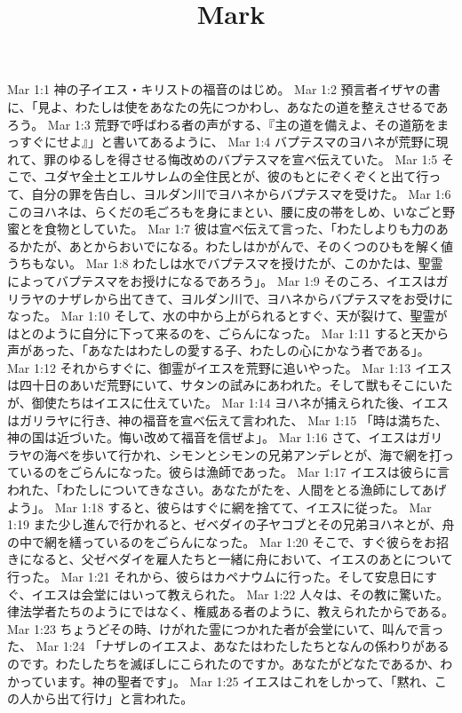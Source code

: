 

\title{Mark}

Mar 1:1  神の子イエス・キリストの福音のはじめ。
Mar 1:2  預言者イザヤの書に、「見よ、わたしは使をあなたの先につかわし、あなたの道を整えさせるであろう。
Mar 1:3  荒野で呼ばわる者の声がする、『主の道を備えよ、その道筋をまっすぐにせよ』」と書いてあるように、
Mar 1:4  バプテスマのヨハネが荒野に現れて、罪のゆるしを得させる悔改めのバプテスマを宣べ伝えていた。
Mar 1:5  そこで、ユダヤ全土とエルサレムの全住民とが、彼のもとにぞくぞくと出て行って、自分の罪を告白し、ヨルダン川でヨハネからバプテスマを受けた。
Mar 1:6  このヨハネは、らくだの毛ごろもを身にまとい、腰に皮の帯をしめ、いなごと野蜜とを食物としていた。
Mar 1:7  彼は宣べ伝えて言った、「わたしよりも力のあるかたが、あとからおいでになる。わたしはかがんで、そのくつのひもを解く値うちもない。
Mar 1:8  わたしは水でバプテスマを授けたが、このかたは、聖霊によってバプテスマをお授けになるであろう」。
Mar 1:9  そのころ、イエスはガリラヤのナザレから出てきて、ヨルダン川で、ヨハネからバプテスマをお受けになった。
Mar 1:10  そして、水の中から上がられるとすぐ、天が裂けて、聖霊がはとのように自分に下って来るのを、ごらんになった。
Mar 1:11  すると天から声があった、「あなたはわたしの愛する子、わたしの心にかなう者である」。
Mar 1:12  それからすぐに、御霊がイエスを荒野に追いやった。
Mar 1:13  イエスは四十日のあいだ荒野にいて、サタンの試みにあわれた。そして獣もそこにいたが、御使たちはイエスに仕えていた。
Mar 1:14  ヨハネが捕えられた後、イエスはガリラヤに行き、神の福音を宣べ伝えて言われた、
Mar 1:15  「時は満ちた、神の国は近づいた。悔い改めて福音を信ぜよ」。
Mar 1:16  さて、イエスはガリラヤの海べを歩いて行かれ、シモンとシモンの兄弟アンデレとが、海で網を打っているのをごらんになった。彼らは漁師であった。
Mar 1:17  イエスは彼らに言われた、「わたしについてきなさい。あなたがたを、人間をとる漁師にしてあげよう」。
Mar 1:18  すると、彼らはすぐに網を捨てて、イエスに従った。
Mar 1:19  また少し進んで行かれると、ゼベダイの子ヤコブとその兄弟ヨハネとが、舟の中で網を繕っているのをごらんになった。
Mar 1:20  そこで、すぐ彼らをお招きになると、父ゼベダイを雇人たちと一緒に舟において、イエスのあとについて行った。
Mar 1:21  それから、彼らはカペナウムに行った。そして安息日にすぐ、イエスは会堂にはいって教えられた。
Mar 1:22  人々は、その教に驚いた。律法学者たちのようにではなく、権威ある者のように、教えられたからである。
Mar 1:23  ちょうどその時、けがれた霊につかれた者が会堂にいて、叫んで言った、
Mar 1:24  「ナザレのイエスよ、あなたはわたしたちとなんの係わりがあるのです。わたしたちを滅ぼしにこられたのですか。あなたがどなたであるか、わかっています。神の聖者です」。
Mar 1:25  イエスはこれをしかって、「黙れ、この人から出て行け」と言われた。
